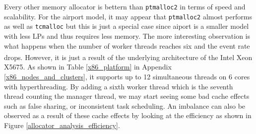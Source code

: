 \documentclass[11pt]{book}
\begin{document}
Every other memory allocator is bettern than \texttt{ptmalloc2} in terms of speed and scalability.
For the airport model, it may appear that \texttt{ptmalloc2} almost performs as well as \texttt{tcmalloc}
but this is just a special case since aiport is a smaller model with less LPs and thus requires
less memory.  The more interesting observation is what happens when the number of worker threads
reaches six and the event rate drops.  However, it is just a result of the underlying architecture of the
Intel\textsuperscript{\textregistered} Xeon\textsuperscript{\textregistered} X5675.  As shown in
Table \ref{x86_platform} in Appendix \ref{x86_nodes_and_clusters}, it supports up to 12 simultaneous
threads on 6 cores with hyperthreading.  By adding a sixth worker thread which is the seventh thread counting the
manager thread, we may start seeing some bad cache effects such as false sharing, or inconsistent
task scheduling.  An imbalance can also be observed as a result of these cache effects by looking at
the efficiency as shown in Figure \ref{allocator_analysis_efficiency}.
\end{document}
